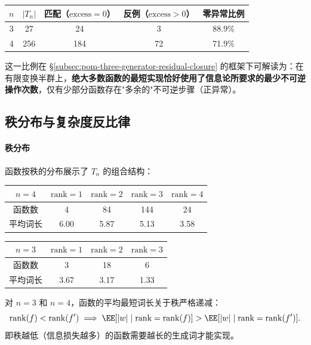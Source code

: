 \begin{center}
\begin{tabular}{c|c|c|c|c}
\toprule
$n$ & $|T_n|$ & 匹配（$\mathrm{excess}=0$） & 反例（$\mathrm{excess}>0$） & 零异常比例 \\
\midrule
3 & 27 & 24 & 3 & 88.9\% \\
4 & 256 & 184 & 72 & 71.9\% \\
\bottomrule
\end{tabular}
\end{center}

\noindent
这一比例在 \S\ref{subsec:pom-three-generator-residual-closure} 的框架下可解读为：在有限变换半群上，\textbf{绝大多数函数的最短实现恰好使用了信息论所要求的最少不可逆操作次数}，仅有少部分函数存在"多余的"不可逆步骤（正异常）。

\subsection{秩分布与复杂度反比律}

\paragraph{秩分布}
函数按秩的分布展示了 $T_n$ 的组合结构：

\begin{center}
\begin{tabular}{c|cccc}
\toprule
$n=4$ & $\mathrm{rank}=1$ & $\mathrm{rank}=2$ & $\mathrm{rank}=3$ & $\mathrm{rank}=4$ \\
\midrule
函数数 & 4 & 84 & 144 & 24 \\
平均词长 & 6.00 & 5.87 & 5.13 & 3.58 \\
\bottomrule
\end{tabular}
\end{center}

\begin{center}
\begin{tabular}{c|ccc}
\toprule
$n=3$ & $\mathrm{rank}=1$ & $\mathrm{rank}=2$ & $\mathrm{rank}=3$ \\
\midrule
函数数 & 3 & 18 & 6 \\
平均词长 & 3.67 & 3.17 & 1.33 \\
\bottomrule
\end{tabular}
\end{center}

\begin{proposition}\label{prop:formal-rank-complexity}
对 $n=3$ 和 $n=4$，函数的平均最短词长关于秩严格递减：
$$
\mathrm{rank}(f) < \mathrm{rank}(f') \implies \EE[|w| \mid \mathrm{rank}=\mathrm{rank}(f)] > \EE[|w| \mid \mathrm{rank}=\mathrm{rank}(f')].
$$
即秩越低（信息损失越多）的函数需要越长的生成词才能实现。
\end{proposition}

